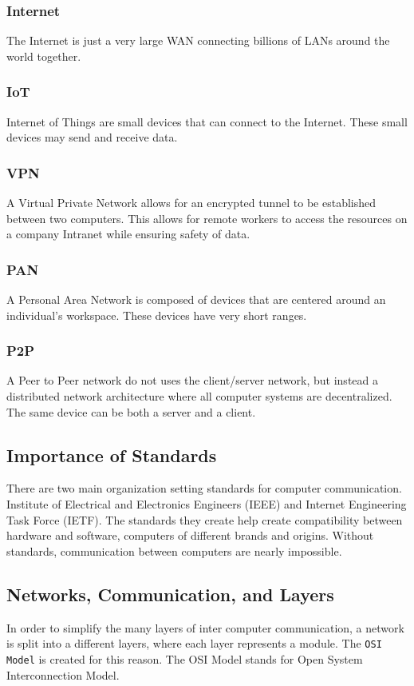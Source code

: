 \documentclass[../notes.tex]{subfiles}
\begin{document}
\subsubsection{Internet}
The Internet is just a very large WAN connecting billions of LANs around the world together.

\subsubsection{IoT}
Internet of Things are small devices that can connect to the Internet. 
These small devices may send and receive data.

\subsubsection{VPN}
A Virtual Private Network allows for an encrypted tunnel to be established between two computers.
This allows for remote workers to access the resources on a company Intranet while ensuring safety of data.

\subsubsection{PAN}
A Personal Area Network is composed of devices that are centered around an individual's workspace.
These devices have very short ranges.

\subsubsection{P2P}
A Peer to Peer network do not uses the client/server network, but instead a distributed network architecture where all computer systems are decentralized.
The same device can be both a server and a client.

\subsection{Importance of Standards}
There are two main organization setting standards for computer communication.
Institute of Electrical and Electronics Engineers (IEEE) and Internet Engineering Task Force (IETF).
The standards they create help create compatibility between hardware and software, computers of different brands and origins.
Without standards, communication between computers are nearly impossible.

\subsection{Networks, Communication, and Layers}
In order to simplify the many layers of inter computer communication, a network is split into a different layers, where each layer represents a module.
The \texttt{OSI Model} is created for this reason.
The OSI Model stands for Open System Interconnection Model.
\end{document}
